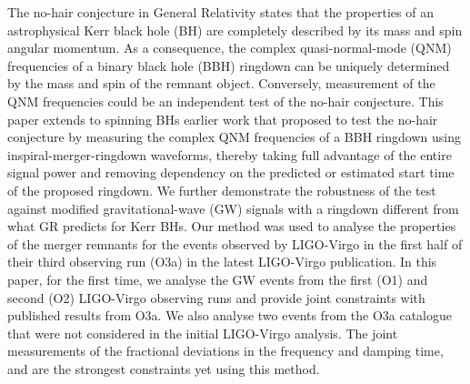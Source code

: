   The no-hair conjecture in General Relativity states that the
  properties of an astrophysical Kerr black hole (BH) are completely described by its
  mass and spin angular momentum. As a consequence, the complex
  quasi-normal-mode (QNM) frequencies of a binary black hole (BBH)
  ringdown can be uniquely determined by the mass and spin of the
  remnant object. Conversely, measurement of the QNM frequencies could
  be an independent test of the no-hair conjecture. This paper extends to spinning BHs earlier work that proposed to
  test the no-hair conjecture by measuring the complex QNM
  frequencies of a BBH ringdown using inspiral-merger-ringdown waveforms, thereby taking full advantage of the entire signal power and removing dependency on the
  predicted or estimated start time of the proposed ringdown. We
  further demonstrate the robustness of the test against modified
  gravitational-wave (GW) signals with a ringdown different from what
  GR predicts for Kerr BHs. Our method was used to analyse the
  properties of the merger remnants for the events observed by
  LIGO-Virgo in the first half of their third observing run (O3a) in
  the latest LIGO-Virgo publication. In this paper, for the first
  time, we analyse the GW events from the first (O1) and second (O2) LIGO-Virgo
  observing runs and provide joint constraints with published results
  from O3a. We also analyse two events from the O3a catalogue
  that were not considered in the initial LIGO-Virgo analysis. The
  joint measurements of the fractional deviations in the frequency and damping time,
   and  are the strongest
  constraints yet using this method. %
